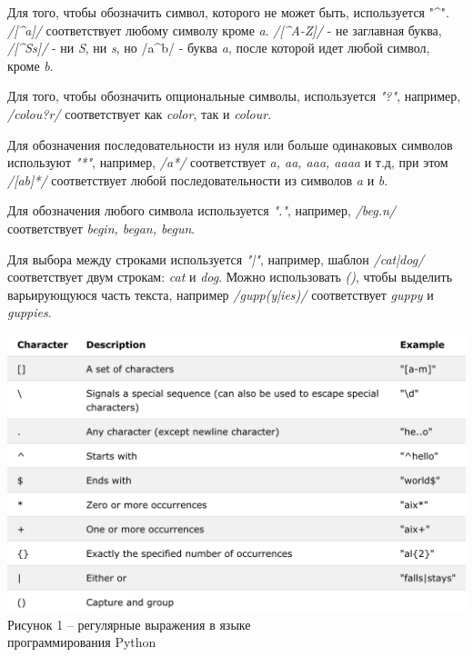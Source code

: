\documentclass[a4paper,12pt,preview]{report} %
\begin{document}
	Для того, чтобы обозначить символ, которого не может быть, используется "\^{}". \textit{/[\^{}a]/} соответствует любому символу кроме \textit{a}. \textit{/[\^{}A-Z]/} - не заглавная буква, \textit{/[\^{}Ss]/} - ни \textit{S}, ни \textit{s}, но /a\^{}b/ - буква \textit{a}, после которой идет любой символ, кроме \textit{b}. 
	
	Для того, чтобы обозначить опциональные символы, используется \textit{"?"}, например, \textit{/colou?r/} соответствует как \textit{color}, так и \textit{colour}. 
	
	Для обозначения последовательности из
нуля или больше одинаковых символов используют \textit{"*"}, например, \textit{/a*/} соответствует \textit{a, aa, aaa, aaaa} и т.д, при этом \textit{/[ab]*/} соответствует любой последовательности из символов \textit{a} и \textit{b}.

	Для обозначения любого символа используется \textit{"."}, например, \textit{/beg.n/} соответствует \textit{begin, began, begun}.
	
	Для выбора между строками используется \textit{"|"}, например, шаблон \textit{/cat|dog/} соответствует двум строкам: \textit{cat} и \textit{dog}. Можно использовать \textit{()}, чтобы выделить варьирующуюся часть текста, например \textit{/gupp(y|ies)/} соответствует \textit{guppy} и \textit{guppies}. 
	
	
	
	
		
	\begin{center}
		\includegraphics[scale=0.2]{regex.png}
		\\ Рисунок 1 -- регулярные выражения в языке \\ программирования Python
	\end{center}
	
\end{document}
